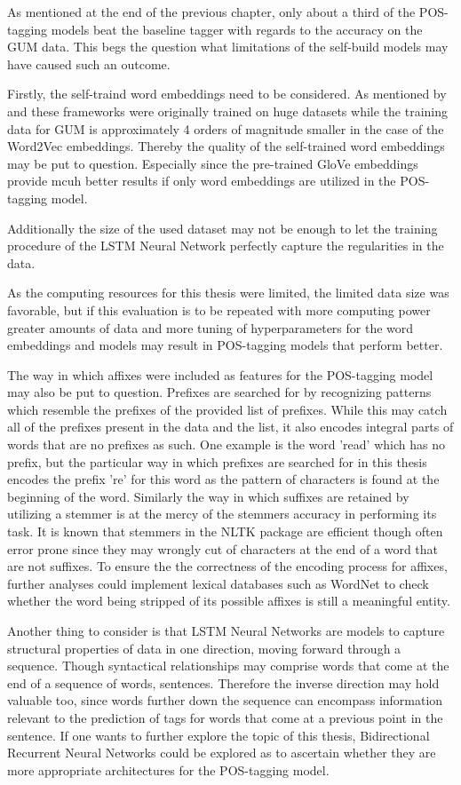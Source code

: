 As mentioned at the end of the previous chapter, only about a third of the POS-tagging models beat the baseline tagger with regards to the accuracy on the GUM data. This begs the question what limitations of the self-build models may have caused such an outcome.

Firstly, the self-traind  word embeddings need to be considered. As mentioned by \citet{mikolov2013efficient} and \citet{jain2016fasttext} these frameworks were originally trained on huge datasets while the training data for GUM is approximately 4 orders of magnitude smaller in the case of the Word2Vec embeddings. Thereby the quality of the self-trained word embeddings may be put to question. Especially since the pre-trained GloVe embeddings provide mcuh better results if only word embeddings are utilized in the POS-tagging model.

Additionally the size of the used dataset may not be enough to let the training procedure of the LSTM Neural Network perfectly capture the regularities in the data.

As the computing resources for this thesis were limited, the limited data size was favorable, but if this evaluation is to be repeated with more computing power greater amounts of data and more tuning of hyperparameters for the word embeddings and models may result in POS-tagging models that perform better.

The way in which affixes were included as features for the POS-tagging model may also be put to question. Prefixes are searched for by recognizing patterns which resemble the prefixes of the provided list of prefixes. While this may catch all of the prefixes present in the data and the list, it also encodes integral parts of words that are no prefixes as such. One example is the word 'read' which has no prefix, but the particular way in which prefixes are searched for in this thesis encodes the prefix 're' for this word as the pattern of characters is found at the beginning of the word.
Similarly the way in which suffixes are retained by utilizing a stemmer is at the mercy of the stemmers accuracy in performing its task. It is known that stemmers in the NLTK package are efficient though often error prone since they may wrongly cut of characters at the end of a word that are not suffixes.
To ensure the the correctness of the encoding process for affixes, further analyses could implement lexical databases such as WordNet to check whether the word being stripped of its possible affixes is still a meaningful entity.

Another thing to consider is that LSTM Neural Networks are models to capture structural properties of data in one direction, moving forward through a sequence. Though syntactical relationships may comprise words that come at the end of a sequence of words, sentences. Therefore the inverse direction may hold valuable too, since words further down the sequence can encompass information relevant to the prediction of tags for words that come at a previous point in the sentence. If one wants to further explore the topic of this thesis, Bidirectional Recurrent Neural Networks could be explored as to ascertain whether they are more appropriate architectures for the POS-tagging model.
